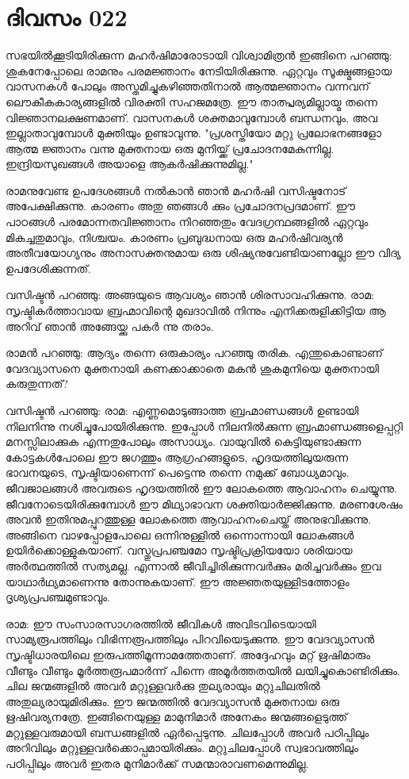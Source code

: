  
\section{ദിവസം 022}


സഭയില്‍ക്കൂടിയിരിക്കുന്ന മഹര്‍ഷിമാരോടായി വിശ്വാമിത്രന്‍ ഇങ്ങിനെ പറഞ്ഞു: ശുകനേപ്പോലെ രാമനും പരമജ്ഞാനം നേടിയിരിക്കുന്നു. ഏറ്റവും സൂക്ഷ്മങ്ങളായ വാസനകള്‍ പോലും അസ്തമിച്ചുകഴിഞ്ഞതിനാല്‍ ആത്മജ്ഞാനം വന്നവന്‌ ലൌകീകകാര്യങ്ങളില്‍ വിരക്തി സഹജമത്രേ. ഈ താത്പ്പര്യമില്ലായ്മ തന്നെ വിജ്ഞാനലക്ഷണമാണ്‌. വാസനകള്‍ ശക്തമാവുമ്പോള്‍ ബന്ധനവും, അവ ഇല്ലാതാവുമ്പോള്‍ മുക്തിയും ഉണ്ടാവുന്നു. "പ്രശസ്തിയോ മറ്റു പ്രലോഭനങ്ങളോ ആത്മ ജ്ഞാനം വന്നു മുക്തനായ ഒരു മുനിയ്ക്ക്‌ പ്രചോദനമേകുന്നില്ല. ഇന്ദ്രിയസുഖങ്ങള്‍ അയാളെ ആകര്‍ഷിക്കുന്നുമില്ല."

രാമനുവേണ്ട ഉപദേശങ്ങള്‍ നല്‍കാന്‍ ഞാന്‍ മഹര്‍ഷി വസിഷ്ടനോട്‌ അപേക്ഷിക്കുന്നു. കാരണം അതു ഞങ്ങള്‍ ക്കും പ്രചോദനപ്രദമാണ്‌. ഈ പാഠങ്ങള്‍ പരമോന്നതവിജ്ഞാനം നിറഞ്ഞതും വേദഗ്രന്ഥങ്ങളില്‍ ഏറ്റവും മികച്ചതുമാവും, നിശ്ചയം. കാരണം പ്രബുദ്ധനായ ഒരു മഹര്‍ഷിവര്യന്‍ അതീവയോഗ്യനും അനാസക്തനുമായ ഒരു ശിഷ്യനുവേണ്ടിയാണല്ലോ ഈ വിദ്യ ഉപദേശിക്കുന്നത്‌. 

വസിഷ്ടന്‍ പറഞ്ഞു: അങ്ങയുടെ ആവശ്യം ഞാന്‍ ശിരസാവഹിക്കുന്നു. രാമ: സൃഷ്ടികര്‍ത്താവായ ബ്രഹ്മാവിന്റെ മുഖദാവില്‍ നിന്നും എനിക്കരുളിക്കിട്ടിയ ആ അറിവ്‌ ഞാന്‍ അങ്ങേയ്ക്കു പകര്‍ ന്നു തരാം.

രാമന്‍ പറഞ്ഞു: ആദ്യം തന്നെ ഒരുകാര്യം പറഞ്ഞു തരിക. എന്തുകൊണ്ടാണ്‌ വേദവ്യാസനെ മുക്തനായി കണക്കാക്കാതെ മകന്‍ ശുകമുനിയെ മുക്തനായി കരുതുന്നത്‌? 

വസിഷ്ടന്‍ പറഞ്ഞു: രാമ: എണ്ണമൊടുങ്ങാത്ത ബ്രഹ്മാണ്ഡങ്ങള്‍ ഉണ്ടായി നിലനിന്നു നശിച്ചുപോയിരിക്കുന്നു. ഇപ്പോള്‍ നിലനില്‍ക്കുന്ന ബ്രഹ്മാണ്ഡങ്ങളെപ്പറ്റി മനസ്സിലാക്കുക എന്നതുപോലും അസാധ്യം. വായുവില്‍ കെട്ടിയുണ്ടാക്കുന്ന കോട്ടകള്‍പോലെ ഈ ജഗത്തും ആഗ്രഹങ്ങളുടെ, ഹൃദയത്തിലുയരുന്ന ഭാവനയുടെ, സൃഷ്ടിയാണെന്ന് പെട്ടെന്നു തന്നെ നമുക്ക്‌ ബോധ്യമാവും. ജീവജാലങ്ങള്‍ അവരുടെ ഹൃദയത്തില്‍ ഈ ലോകത്തെ ആവാഹനം ചെയ്യുന്നു. ജീവനോടെയിരിക്കുമ്പോള്‍ ഈ മിഥ്യാഭാവന ശക്തിയാര്‍ജ്ജിക്കുന്നു. മരണശേഷം അവന്‍ ഇതിനുമപ്പുറത്തുള്ള ലോകത്തെ ആവാഹനംചെയ്ത്‌ അനുഭവിക്കുന്നു. അങ്ങിനെ വാഴപ്പോളപോലെ ഒന്നിനുള്ളില്‍ ഒന്നൊന്നായി ലോകങ്ങള്‍ ഉയിര്‍ക്കൊള്ളുകയാണ്‌. വസ്തുപ്രപഞ്ചമോ സൃഷ്ടിപ്രക്രിയയോ ശരിയായ അര്‍ത്ഥത്തില്‍ സത്യമല്ല. എന്നാല്‍ ജീവിച്ചിരിക്കുന്നവര്‍ക്കും മരിച്ചവര്‍ക്കും ഇവ യാഥാര്‍ഥ്യമാണെന്നു തോന്നുകയാണ്‌. ഈ അജ്ഞതയുള്ളിടത്തോളം ദൃശ്യപ്രപഞ്ചമുണ്ടാവും.

രാമ: ഈ സംസാരസാഗരത്തില്‍ ജീവികള്‍ അവിടവിടെയായി സാമ്യരൂപത്തിലും വിഭിന്നരൂപത്തിലും പിറവിയെടുക്കുന്നു. ഈ വേദവ്യാസന്‍ സൃഷ്ടിധാരയിലെ ഇരുപത്തിമൂന്നാമത്തേതാണ്‌. അദ്ദേഹവും മറ്റ്‌ ഋഷിമാരും വീണ്ടും വീണ്ടും മൂര്‍ത്തരൂപമാര്‍ന്ന് പിന്നെ അമൂര്‍ത്തതയില്‍ ലയിച്ചുകൊണ്ടിരിക്കും. ചില ജന്മങ്ങളില്‍ അവര്‍ മറ്റുള്ളവര്‍ക്കു തുല്യരായും മറ്റുചിലതില്‍ അതുല്യരായുമിരിക്കും. ഈ ജന്മത്തില്‍ വേദവ്യാസന്‍ മുക്തനായ ഒരു ഋഷിവര്യനത്രേ. ഇങ്ങിനെയുള്ള മാമുനിമാര്‍ അനേകം ജന്മങ്ങളെടുത്ത്‌ മറ്റുള്ളവരുമായി ബന്ധങ്ങളില്‍ ഏര്‍പ്പെടുന്നു. ചിലപ്പോള്‍ അവര്‍ പഠിപ്പിലും അറിവിലും മറ്റുള്ളവര്‍ക്കൊപ്പമായിരിക്കും. മറ്റുചിലപ്പോള്‍ സ്വഭാവത്തിലും പഠിപ്പിലും അവര്‍ ഇതര മുനിമാര്‍ക്ക്‌ സമന്മാരാവണമെന്നുമില്ല.
